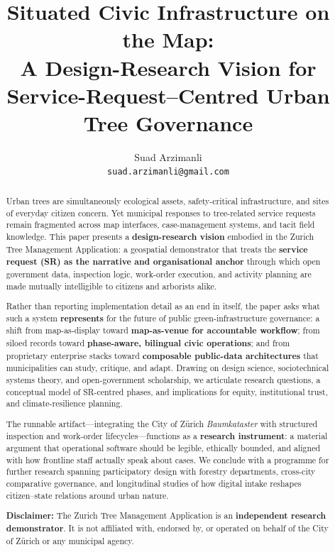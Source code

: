 \documentclass[12pt,a4paper]{article}
\title{Situated Civic Infrastructure on the Map:\\
       A Design-Research Vision for Service-Request--Centred Urban Tree Governance}
\author{Suad Arzimanli \\ \texttt{suad.arzimanli@gmail.com}}
\date{}
\newcommand{\appname}{Zurich Tree Management Application}
\begin{document}
\maketitle

\begin{abstract}
Urban trees are simultaneously ecological assets, safety-critical infrastructure, and sites of everyday citizen concern. Yet municipal responses to tree-related service requests remain fragmented across map interfaces, case-management systems, and tacit field knowledge. This paper presents a \textbf{design-research vision} embodied in the \appname{}: a geospatial demonstrator that treats the \textbf{service request (SR) as the narrative and organisational anchor} through which open government data, inspection logic, work-order execution, and activity planning are made mutually intelligible to citizens and arborists alike.

Rather than reporting implementation detail as an end in itself, the paper asks what such a system \textbf{represents} for the future of public green-infrastructure governance: a shift from map-as-display toward \textbf{map-as-venue for accountable workflow}; from siloed records toward \textbf{phase-aware, bilingual civic operations}; and from proprietary enterprise stacks toward \textbf{composable public-data architectures} that municipalities can study, critique, and adapt. Drawing on design science, sociotechnical systems theory, and open-government scholarship, we articulate research questions, a conceptual model of SR-centred phases, and implications for equity, institutional trust, and climate-resilience planning.

The runnable artifact---integrating the City of Zürich \emph{Baumkataster} with structured inspection and work-order lifecycles---functions as a \textbf{research instrument}: a material argument that operational software should be legible, ethically bounded, and aligned with how frontline staff actually speak about cases. We conclude with a programme for further research spanning participatory design with forestry departments, cross-city comparative governance, and longitudinal studies of how digital intake reshapes citizen--state relations around urban nature.

\medskip
\noindent\textbf{Disclaimer:} The \appname{} is an \textbf{independent research demonstrator}. It is not affiliated with, endorsed by, or operated on behalf of the City of Zürich or any municipal agency.
\end{abstract}
\end{document}
